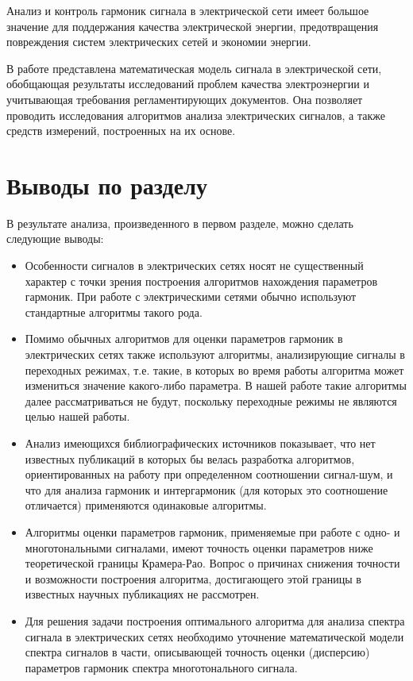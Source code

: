 Анализ и контроль гармоник сигнала в электрической сети имеет большое значение для поддержания качества электрической энергии, предотвращения повреждения систем электрических сетей и экономии энергии. 

В работе представлена математическая модель сигнала в электрической сети, обобщающая результаты исследований проблем качества электроэнергии и учитывающая требования регламентирующих документов. Она позволяет проводить исследования алгоритмов анализа электрических сигналов, а также средств измерений, построенных на их основе.

\section{Выводы по разделу} \label{sec:ch1/sec7} 

В результате анализа, произведенного в первом разделе, можно сделать следующие выводы:
\begin{itemize}
\item Особенности сигналов в электрических сетях носят не существенный характер с точки зрения построения алгоритмов нахождения параметров гармоник. При работе с электрическими сетями обычно используют стандартные алгоритмы такого рода.

\item Помимо обычных алгоритмов для оценки параметров гармоник в электрических сетях также используют алгоритмы, анализирующие сигналы в переходных режимах, т.е. такие, в которых во время работы алгоритма может измениться значение какого-либо параметра. В нашей работе такие алгоритмы далее рассматриваться не будут, поскольку переходные режимы не являются целью нашей работы.

\item Анализ имеющихся библиографических источников показывает, что нет известных публикаций в которых бы велась разработка алгоритмов, ориентированных на работу при определенном соотношении сигнал-шум, и что для анализа гармоник и интергармоник (для которых это соотношение отличается) применяются одинаковые алгоритмы.

\item Алгоритмы оценки параметров гармоник, применяемые при работе с одно- и многотональными сигналами, имеют точность оценки параметров ниже теоретической границы Крамера-Рао. Вопрос о причинах снижения точности и возможности построения алгоритма, достигающего этой границы в известных научных публикациях не рассмотрен.

\item Для решения задачи построения оптимального алгоритма для анализа спектра сигнала в электрических сетях необходимо уточнение математической модели спектра сигналов в части, описывающей точность оценки (дисперсию) параметров гармоник спектра многотонального сигнала.
\end{itemize}

